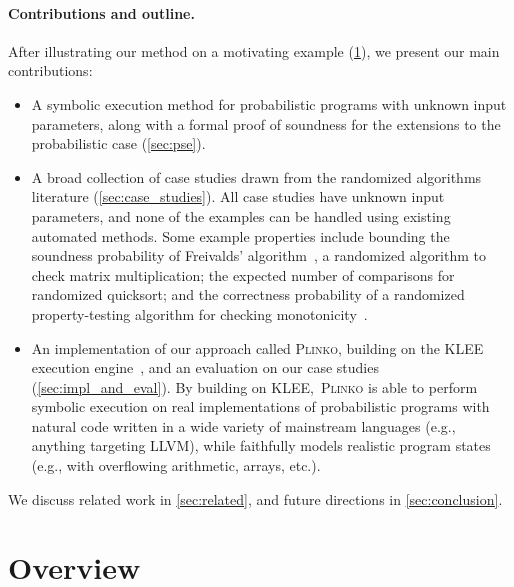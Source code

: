 \documentclass[acmsmall,review,anonymous]{acmart}\settopmatter{printfolios=true,printccs=false,printacmref=false}
\newcommand{\SYSTEM}{\textsc{Plinko}\xspace}
\begin{document}
\paragraph*{Contributions and outline.}
After illustrating our method on a motivating example (\cref{sec:overview}), we
present our main contributions:
% 
\begin{itemize}
\item A symbolic execution method for probabilistic programs with unknown
  input parameters, along with a formal proof of soundness for the extensions
  to the probabilistic case (\cref{sec:pse}).
\item A broad collection of case studies drawn from the randomized algorithms
  literature (\cref{sec:case_studies}). All case studies have unknown input
  parameters, and none of the examples can be handled using existing automated
  methods. Some example properties include bounding the soundness probability of
  Freivalds' algorithm~\citep{freivalds1977}, a randomized algorithm to check
  matrix multiplication; the expected number of comparisons for randomized
  quicksort; and the correctness probability of a randomized property-testing
  algorithm for checking monotonicity~\citep{goldreich_2017}.
\item An implementation of our approach called \SYSTEM, building on the KLEE
  execution engine~\citep{cadar2008}, and an evaluation on our case studies
  (\cref{sec:impl_and_eval}). By building on KLEE,~\SYSTEM is able to
  perform symbolic execution on real implementations of probabilistic programs
  with natural code written in a wide variety of mainstream languages (e.g.,
  anything targeting LLVM), while faithfully models realistic program states
  (e.g., with overflowing arithmetic, arrays, etc.).
\end{itemize}
% 
We discuss related work in \cref{sec:related}, and future directions in
\cref{sec:conclusion}.

\section{Overview}
\label{sec:overview}
\end{document}
